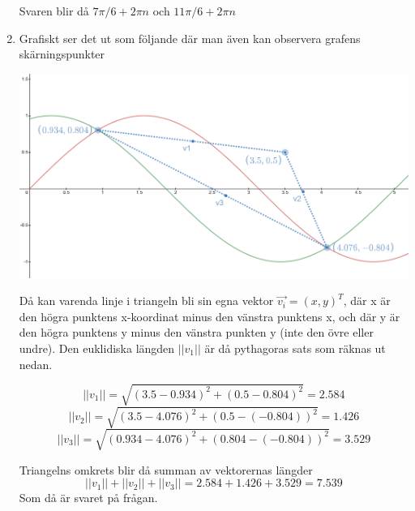 \documentclass[a4paper,12pt]{article}
\begin{document}
\begin{enumerate}
            Svaren blir då $7\pi/6 +2\pi n$ och $11\pi/6 +2\pi n$

      \item Grafiskt ser det ut som följande
            där man även kan observera grafens skärningspunkter

            \includegraphics[scale=0.5]{Figur6.png}

            Då kan varenda linje i triangeln bli sin egna vektor $\vec{v_i}=(x,y)^T$, där
            x är den högra punktens x-koordinat minus den vänstra punktens x, och där y är den högra punktens y minus
            den vänstra punkten y (inte den övre eller undre).
            Den euklidiska längden $||v_1||$ är då pythagoras sats som räknas ut nedan.

            $$||v_1||=\sqrt{(3.5-0.934)^2+(0.5-0.804)^2}=2.584$$
            $$||v_2||=\sqrt{(3.5-4.076)^2+(0.5-(-0.804))^2}=1.426$$
            $$||v_3||=\sqrt{(0.934-4.076)^2+(0.804-(-0.804))^2}=3.529$$

            Triangelns omkrets blir då summan av vektorernas längder
            $$||v_1||+||v_2||+||v_3||=2.584+1.426+3.529=7.539$$
            Som då är svaret på frågan.
\end{enumerate}
\end{document}
